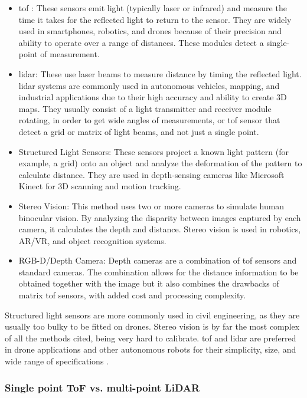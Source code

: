 \begin{itemize}
  \item \gls{tof} : These sensors emit light (typically laser or infrared) and measure
  the time it takes for the reflected light to return to the sensor. They are widely used in
  smartphones, robotics, and drones because of their precision and ability to operate over a range
  of distances. These modules detect a single-point of measurement.
  \item \gls{lidar}: These use laser beams to measure distance by timing the
  reflected light. \gls{lidar} systems are commonly used in autonomous vehicles, mapping, and industrial
  applications due to their high accuracy and ability to create 3D maps. They usually consist of a light
  transmitter and receiver module rotating, in order to get wide angles of measurements, or \gls{tof}
  sensor that detect a grid or matrix of light beams, and not just a single point.
  \item Structured Light Sensors: These sensors project a known light pattern (for example, a grid)
  onto an object and analyze the deformation of the pattern to calculate distance. They are used in
  depth-sensing cameras like Microsoft Kinect for 3D scanning and motion tracking.
  \item Stereo Vision: This method uses two or more cameras to simulate human binocular vision.
  By analyzing the disparity between images captured by each camera, it calculates the depth and distance.
  Stereo vision is used in robotics, AR/VR, and object recognition systems.
  \item RGB-D/Depth Camera: Depth cameras are a combination of \gls{tof} sensors and standard cameras.
  The combination allows for the distance information to be obtained together with the image but it also
  combines the drawbacks of matrix \gls{tof} sensors, with added cost and processing complexity.
\end{itemize}

Structured light sensors are more commonly used in civil engineering, as they are usually too
bulky to be fitted on drones. Stereo vision is by far the most complex of all the methods cited,
being very hard to calibrate. \gls{tof} and \gls{lidar} are preferred in drone applications and other
autonomous robots for their simplicity, size, and wide range of specifications \cite{dronesensors}.

\subsubsection{Single point ToF vs. multi-point LiDAR}

